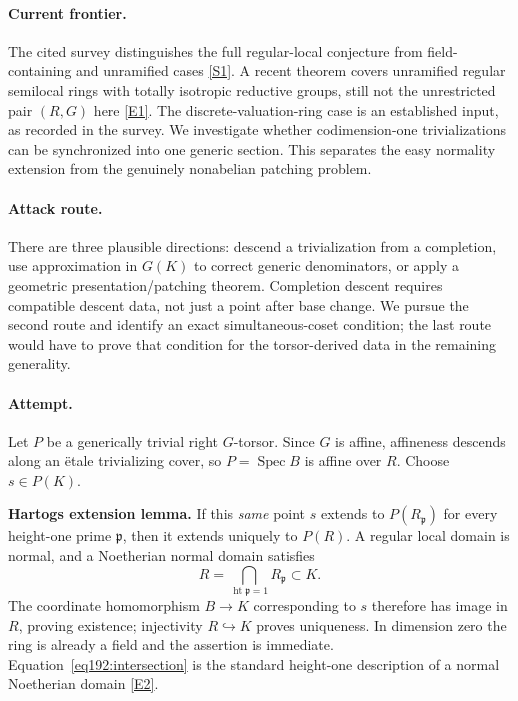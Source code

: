 \documentclass[11pt,a4paper]{article}
\newcommand{\sref}[2]{\hyperlink{source:#1:#2}{[S#2]}}
\newcommand{\eref}[2]{\hyperlink{extra:#1:#2}{[E#2]}}
\numberwithin{equation}{section}
\begin{document}
\paragraph{Current frontier.}
The cited survey distinguishes the full regular-local conjecture from field-containing and unramified cases \sref{30002360}{1}. A recent theorem covers unramified regular semilocal rings with totally isotropic reductive groups, still not the unrestricted pair $(R,G)$ here \eref{30002360}{1}. The discrete-valuation-ring case is an established input, as recorded in the survey. We investigate whether codimension-one trivializations can be synchronized into one generic section. This separates the easy normality extension from the genuinely nonabelian patching problem.

\paragraph{Attack route.}
There are three plausible directions: descend a trivialization from a completion, use approximation in $G(K)$ to correct generic denominators, or apply a geometric presentation/patching theorem. Completion descent requires compatible descent data, not just a point after base change. We pursue the second route and identify an exact simultaneous-coset condition; the last route would have to prove that condition for the torsor-derived data in the remaining generality.

\paragraph{Attempt.}
Let $P$ be a generically trivial right $G$-torsor. Since $G$ is affine, affineness descends along an \"etale trivializing cover, so $P=\operatorname{Spec}B$ is affine over $R$. Choose $s\in P(K)$.

\textbf{Hartogs extension lemma.} If this \emph{same} point $s$ extends to $P(R_{\mathfrak p})$ for every height-one prime $\mathfrak p$, then it extends uniquely to $P(R)$.
A regular local domain is normal, and a Noetherian normal domain satisfies
\begin{equation}\label{eq192:intersection}
 R=\bigcap_{\operatorname{ht}\mathfrak p=1}R_{\mathfrak p}\subset K.
\end{equation}
The coordinate homomorphism $B\to K$ corresponding to $s$ therefore has image in $R$, proving existence; injectivity $R\hookrightarrow K$ proves uniqueness. In dimension zero the ring is already a field and the assertion is immediate. Equation~\eqref{eq192:intersection} is the standard height-one description of a normal Noetherian domain \eref{30002360}{2}.
\end{document}
